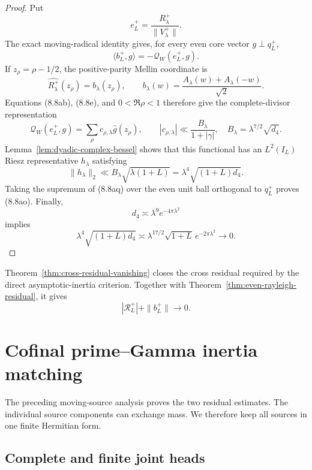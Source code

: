 \documentclass[11pt]{amsart}
\theoremstyle{definition}
\theoremstyle{remark}
\newcommand{\QW}{\mathcal Q_W}
\begin{document}
\begin{proof}
Put
\[
 e_L^+=\frac{R_\lambda^+}{\|V_\lambda^+\|}.
\tag{8.8ap}
\]
The exact moving-radical identity gives, for every even core vector
\(g\perp q_L^+\),
\[
 \langle b_L^+,g\rangle=-\QW(e_L^+,g).
\tag{8.8aq}
\]
If \(z_\rho=\rho-1/2\), the positive-parity Mellin coordinate is
\[
 \widehat {R_\lambda^+}(z_\rho)
 =b_\lambda(z_\rho),
 \qquad
 b_\lambda(w)=\frac{A_\lambda(w)+A_\lambda(-w)}{\sqrt2}.
\tag{8.8ar}
\]
Equations (8.8ab), (8.8e), and \(0<\Re\rho<1\) therefore give the
complete-divisor representation
\[
 \QW(e_L^+,g)
 =\sum_\rho c_{\rho,\lambda}\widehat g(z_\rho),
 \qquad
 |c_{\rho,\lambda}|
 \ll\frac{B_\lambda}{1+|\gamma|},
 \quad
 B_\lambda=\lambda^{7/2}\sqrt{d_4}.
\tag{8.8as}
\]
Lemma~\ref{lem:dyadic-complex-bessel} shows that this functional has an
\(L^2(I_L)\) Riesz representative \(h_\lambda\) satisfying
\[
 \|h_\lambda\|_2
 \ll B_\lambda\sqrt{\lambda(1+L)}
 =\lambda^4\sqrt{(1+L)d_4}.
\tag{8.8at}
\]
Taking the supremum of (8.8aq) over the even unit ball orthogonal to
\(q_L^+\) proves (8.8ao).  Finally,
\[
 d_4\asymp\lambda^9e^{-4\pi\lambda^2}
\tag{8.8au}
\]
implies
\[
 \lambda^4\sqrt{(1+L)d_4}
 \asymp\lambda^{17/2}\sqrt{1+L}\,e^{-2\pi\lambda^2}
 \longrightarrow0.
\tag{8.8av}
\]
\end{proof}

Theorem~\ref{thm:cross-residual-vanishing} closes the cross residual
required by the direct asymptotic-inertia criterion.  Together with
Theorem~\ref{thm:even-rayleigh-residual}, it gives
\[
 |\mathscr R_L^+|+\|b_L^+\|\longrightarrow0.
\tag{8.8aw}
\]

\section{Cofinal prime--Gamma inertia matching}
\label{sec:cofinal-inertia}

The preceding moving-source analysis proves the two residual estimates.
The individual source components can exchange mass.  We therefore keep
all sources in one finite Hermitian form.

\subsection{Complete and finite joint heads}
\end{document}
